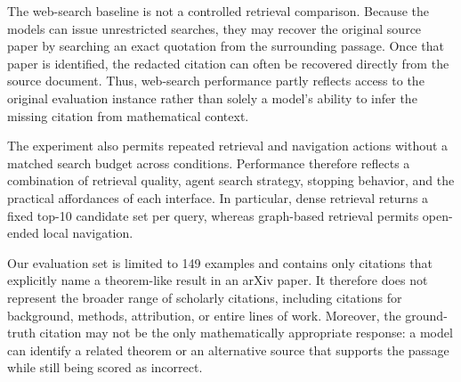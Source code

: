 The web-search baseline is not a controlled retrieval comparison. Because the models can issue unrestricted searches, they may recover the original source paper by searching an exact quotation from the surrounding passage. Once that paper is identified, the redacted citation can often be recovered directly from the source document. Thus, web-search performance partly reflects access to the original evaluation instance rather than solely a model's ability to infer the missing citation from mathematical context.

The experiment also permits repeated retrieval and navigation actions without a matched search budget across conditions. Performance therefore reflects a combination of retrieval quality, agent search strategy, stopping behavior, and the practical affordances of each interface. In particular, dense retrieval returns a fixed top-10 candidate set per query, whereas graph-based retrieval permits open-ended local navigation.

Our evaluation set is limited to 149 examples and contains only citations that explicitly name a theorem-like result in an arXiv paper. It therefore does not represent the broader range of scholarly citations, including citations for background, methods, attribution, or entire lines of work. Moreover, the ground-truth citation may not be the only mathematically appropriate response: a model can identify a related theorem or an alternative source that supports the passage while still being scored as incorrect.